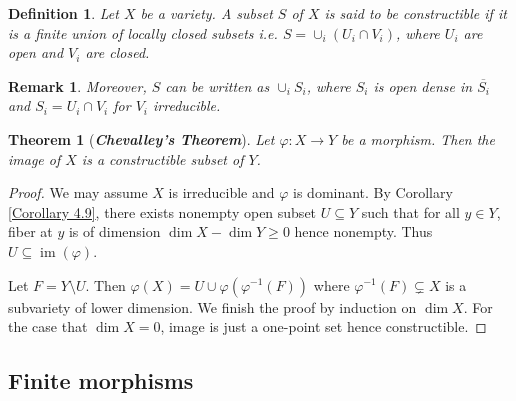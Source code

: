 \documentclass{ctexart}
\newtheorem{definition}{Definition}[section]
\newtheorem{remark}{Remark}[section]
\newtheorem{theorem}{Theorem}[section]
\newcommand{\im}{\operatorname{im}}
\begin{document}
\begin{definition}
    Let $X$ be a variety.
    A subset $S$ of $X$ is said to be constructible if it is a finite union of locally closed subsets i.e. $S = \cup_{i} (U_{i} \cap V_{i})$,
    where $U_{i}$ are open and $V_{i}$ are closed.
\end{definition}
\begin{remark}
    Moreover, $S$ can be written as $\cup_{i} S_{i}$, 
    where $S_{i}$ is open dense in $\overline{S_{i}}$ and $S_{i} = U_{i} \cap V_{i}$ for $V_{i}$ irreducible.
\end{remark}
\begin{theorem}[\textbf{\emph{Chevalley's Theorem}}]
    Let $\varphi:X \rightarrow Y$ be a morphism.
    Then the image of $X$ is a constructible subset of $Y$.
    \label{Theorem 4.8}
\end{theorem}
\begin{proof}
    We may assume $X$ is irreducible and $\varphi$ is dominant.
    By Corollary \ref{Corollary 4.9}, there exists nonempty open subset $U \subseteq Y$ such that for all $y\in Y$,
    fiber at $y$ is of dimension $\dim X - \dim Y \ge 0$ hence nonempty.
    Thus $U \subseteq \im(\varphi)$.
    \par
    Let $F = Y \setminus U$.
    Then $\varphi(X) = U \cup \varphi(\varphi^{-1}(F))$ where $\varphi^{-1}(F) \subsetneq X$ is a subvariety of lower dimension.
    We finish the proof by induction on $\dim X$.
    For the case that $\dim X = 0$, image is just a one-point set hence constructible.
\end{proof}

\subsection{Finite morphisms}
\label{subsection:Dimension_Theory_Finite_morphisms}
\end{document}
